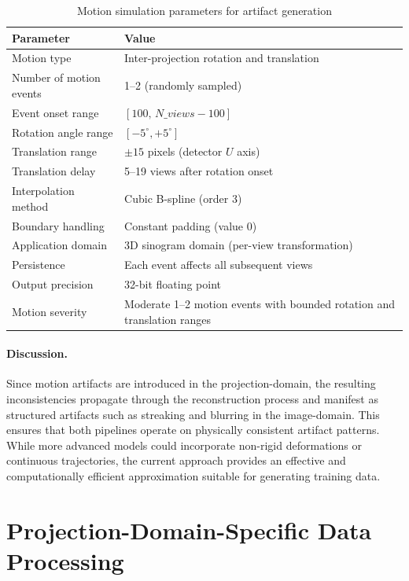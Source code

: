 \begin{table}[H]
\centering
\caption{Motion simulation parameters for artifact generation}
\label{tab:motion_parameters}
\begin{tabular}{p{5cm} p{9cm}}
\hline
\textbf{Parameter} & \textbf{Value} \\
\hline
Motion type & Inter-projection rotation and translation \\
Number of motion events & 1--2 (randomly sampled) \\
Event onset range & $[100,\, N\_{views}-100]$\\
Rotation angle range &  $[-5^\circ, +5^\circ]$\\
Translation range & $\pm 15$ pixels (detector $U$ axis)\\
Translation delay & 5--19 views after rotation onset \\
Interpolation method & Cubic B-spline (order 3)\\
Boundary handling & Constant padding (value 0) \\
Application domain & 3D sinogram domain (per-view transformation) \\
Persistence & Each event affects all subsequent views \\
Output precision & 32-bit floating point \\
Motion severity & Moderate 1–2 motion events with bounded rotation and translation ranges\\
\hline
\end{tabular}
\end{table}

\paragraph{Discussion.}
Since motion artifacts are introduced in the projection-domain, the resulting inconsistencies propagate through the reconstruction process and manifest as structured artifacts such as streaking and blurring in the image-domain. This ensures that both pipelines operate on physically consistent artifact patterns. While more advanced models could incorporate non-rigid deformations or continuous trajectories, the current approach provides an effective and computationally efficient approximation suitable for generating training data. 


\section{Projection-Domain-Specific Data Processing }
